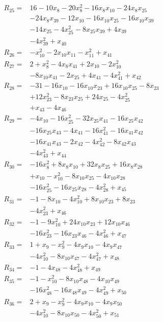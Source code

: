 \begin{align*}
R_{25}={}&16 -10x_{8} -20x_{8}^{2} -16x_{8}x_{10} -24x_{8}x_{25}\\
&-24x_{8}x_{39} -12x_{10} -16x_{10}x_{25} -16x_{10}x_{39}\\
&-14x_{25} -4x_{25}^{2} -8x_{25}x_{39} +4x_{39}\\
&-4x_{39}^{2} +x_{40}\\[3pt]
R_{26}={}&-x_{10}^{2} -2x_{10}x_{11} -x_{11}^{2} +x_{41}\\[3pt]
R_{27}={}&2 +x_{8}^{2} -4x_{8}x_{41} +2x_{10} -2x_{10}^{2}\\
&-8x_{10}x_{41} -2x_{25} +4x_{41} -4x_{41}^{2} +x_{42}\\[3pt]
R_{28}={}&-31 -16x_{10} -16x_{10}x_{23} +16x_{10}x_{25} -8x_{23}\\
&+12x_{23}^{2} -8x_{23}x_{25} +24x_{25} -4x_{25}^{2}\\
&+x_{43} -4x_{46}\\[3pt]
R_{29}={}&-4x_{10} -16x_{25}^{2} -32x_{25}x_{41} -16x_{25}x_{42}\\
&-16x_{25}x_{43} -4x_{41} -16x_{41}^{2} -16x_{41}x_{42}\\
&-16x_{41}x_{43} -2x_{42} -4x_{42}^{2} -8x_{42}x_{43}\\
&-4x_{43}^{2} +x_{44}\\[3pt]
R_{30}={}&-16x_{8}^{2} +8x_{8}x_{10} +32x_{8}x_{25} +16x_{8}x_{28}\\
&+x_{10} -x_{10}^{2} -8x_{10}x_{25} -4x_{10}x_{28}\\
&-16x_{25}^{2} -16x_{25}x_{28} -4x_{28}^{2} +x_{45}\\[3pt]
R_{31}={}&-1 -8x_{10} -4x_{10}^{2} +8x_{10}x_{23} +8x_{23}\\
&-4x_{23}^{2} +x_{46}\\[3pt]
R_{32}={}&-1 -9x_{10}^{2} +24x_{10}x_{23} +12x_{10}x_{46}\\
&-16x_{23}^{2} -16x_{23}x_{46} -4x_{46}^{2} +x_{47}\\[3pt]
R_{33}={}&1 +x_{9} -x_{9}^{2} -4x_{9}x_{10} -4x_{9}x_{47}\\
&-4x_{10}^{2} -8x_{10}x_{47} -4x_{47}^{2} +x_{48}\\[3pt]
R_{34}={}&-1 -4x_{48} -4x_{48}^{2} +x_{49}\\[3pt]
R_{35}={}&-1 -x_{10}^{2} -8x_{10}x_{48} -4x_{10}x_{49}\\
&-16x_{48}^{2} -16x_{48}x_{49} -4x_{49}^{2} +x_{50}\\[3pt]
R_{36}={}&2 +x_{9} -x_{9}^{2} -4x_{9}x_{10} -4x_{9}x_{50}\\
&-4x_{10}^{2} -8x_{10}x_{50} -4x_{50}^{2} +x_{51}\\[3pt]

\end{align*}
